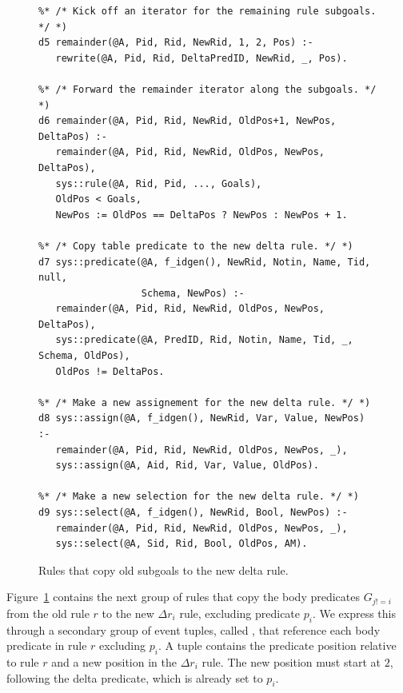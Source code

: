 \begin{figure}[!t]
\ssp
\centering
\begin{lstlisting}
%* /* Kick off an iterator for the remaining rule subgoals. */ *)
d5 remainder(@A, Pid, Rid, NewRid, 1, 2, Pos) :-
   rewrite(@A, Pid, Rid, DeltaPredID, NewRid, _, Pos).

%* /* Forward the remainder iterator along the subgoals. */ *)
d6 remainder(@A, Pid, Rid, NewRid, OldPos+1, NewPos, DeltaPos) :-
   remainder(@A, Pid, Rid, NewRid, OldPos, NewPos, DeltaPos),
   sys::rule(@A, Rid, Pid, ..., Goals),
   OldPos < Goals,
   NewPos := OldPos == DeltaPos ? NewPos : NewPos + 1.

%* /* Copy table predicate to the new delta rule. */ *)
d7 sys::predicate(@A, f_idgen(), NewRid, Notin, Name, Tid, null, 
                  Schema, NewPos) :-
   remainder(@A, Pid, Rid, NewRid, OldPos, NewPos, DeltaPos),
   sys::predicate(@A, PredID, Rid, Notin, Name, Tid, _, Schema, OldPos),
   OldPos != DeltaPos.

%* /* Make a new assignement for the new delta rule. */ *)
d8 sys::assign(@A, f_idgen(), NewRid, Var, Value, NewPos) :-
   remainder(@A, Pid, Rid, NewRid, OldPos, NewPos, _),
   sys::assign(@A, Aid, Rid, Var, Value, OldPos).

%* /* Make a new selection for the new delta rule. */ *)
d9 sys::select(@A, f_idgen(), NewRid, Bool, NewPos) :-
   remainder(@A, Pid, Rid, NewRid, OldPos, NewPos, _),
   sys::select(@A, Sid, Rid, Bool, OldPos, AM).

\end{lstlisting}
\caption{\label{ch:evita:fig:delta3}Rules that copy old subgoals to the new 
delta rule.}
\end{figure}

Figure~\ref{ch:evita:fig:delta3} contains the next group of rules that copy the
body predicates $G_{j!=i}$ from the old rule $r$ to the new $\Delta r_i$ rule,
excluding predicate $p_i$.  We express this through a secondary group of event
tuples, called , that reference each body predicate in rule $r$
excluding $p_i$.  A  tuple contains the predicate position
relative to rule $r$ and a new position in the $\Delta r_i$ rule.  The new
position must start at $2$, following the delta predicate, which is already set
to $p_i$.

